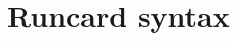 \documentclass{SciPost}
\DeclareRobustCommand{\ensuremathrm}[1]{\ensuremath{\mathrm{#1}}}
\DeclareRobustCommand{\Pp}{{\ensuremathrm{p}}\xspace}
\begin{document}



\section{Runcard syntax}
\label{sec:runcard}

\end{document}

